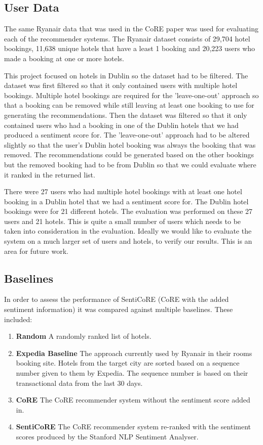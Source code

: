\subsection{User Data}
The same Ryanair data that was used in the CoRE paper was used for evaluating each of the recommender systems. The Ryanair dataset consists of 29,704 hotel bookings, 11,638 unique hotels that have a least 1 booking and 20,223 users who made a booking at one or more hotels.

This project focused on hotels in Dublin so the dataset had to be filtered. The dataset was first filtered so that it only contained users with multiple hotel bookings. Multiple hotel bookings are required for the 'leave-one-out' approach so that a booking can be removed while still leaving at least one booking to use for generating the recommendations. Then the dataset was filtered so that it only contained users who had a booking in one of the Dublin hotels that we had produced a sentiment score for. The 'leave-one-out' approach had to be altered slightly so that the user's Dublin hotel booking was always the booking that was removed. The recommendations could be generated based on the other bookings but the removed booking had to be from Dublin so that we could evaluate where it ranked in the returned list.

There were 27 users who had multiple hotel bookings with at least one hotel booking in a Dublin hotel that we had a sentiment score for. The Dublin hotel bookings were for 21 different hotels. The evaluation was performed on these 27 users and 21 hotels. This is quite a small number of users which needs to be taken into consideration in the evaluation. Ideally we would like to evaluate the system on a much larger set of users and hotels, to verify our results. This is an area for future work.

\subsection{Baselines}

In order to assess the performance of SentiCoRE (CoRE with the added sentiment information) it was compared against multiple baselines. These included: 
\begin{enumerate}
    \item \textbf{Random} \newline
    A randomly ranked list of hotels.
    \item \textbf{Expedia Baseline} \newline
    The approach currently used by Ryanair in their rooms booking site. Hotels from the target city are sorted based on a sequence number given to them by Expedia. The sequence number is based on their transactional data from the last 30 days.
    \item \textbf{CoRE} \newline
    The CoRE recommender system without the sentiment score added in.
    \item \textbf{SentiCoRE} \newline
    The CoRE recommender system re-ranked with the sentiment scores produced by the Stanford NLP Sentiment Analyser.
\end{enumerate}

